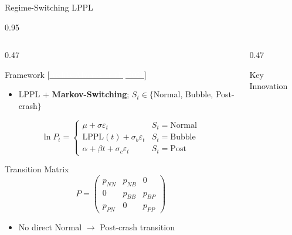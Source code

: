 \documentclass[9pt, aspectratio=169, t]{beamer}
\begin{document}
\begin{frame}{Regime-Switching LPPL}
    \begin{cminipage}{0.95\textwidth}
    {\scriptsize
    \begin{columns}[T]
        \begin{column}{0.47\textwidth}
            \begin{block}{Framework {\scriptsize[\href{https://doi.org/10.1016/j.physa.2020.125367}{\textcolor{white}{Ardila-Alvarez et al., 2021}}]}}
                \begin{itemize}\setlength{\itemsep}{0pt}
                    \item LPPL + \textbf{Markov-Switching}; $S_t \in \{$Normal, Bubble, Post-crash$\}$
                \end{itemize}
                \vspace{-2mm}
                $$\ln P_t = \begin{cases}
                    \mu + \sigma\varepsilon_t & S_t = \text{Normal} \\
                    \text{LPPL}(t) + \sigma_b\varepsilon_t & S_t = \text{Bubble} \\
                    \alpha + \beta t + \sigma_c\varepsilon_t & S_t = \text{Post}
                \end{cases}$$
            \end{block}
            \vspace{-2mm}
            \begin{exampleblock}{Transition Matrix}
                \vspace{-2mm}
                $$P = \begin{pmatrix}
                    p_{NN} & p_{NB} & 0 \\
                    0 & p_{BB} & p_{BP} \\
                    p_{PN} & 0 & p_{PP}
                \end{pmatrix}$$
                \vspace{-4mm}
                \begin{itemize}\setlength{\itemsep}{0pt}
                    \item No direct Normal $\to$ Post-crash transition
                \end{itemize}
            \end{exampleblock}
        \end{column}
        \begin{column}{0.47\textwidth}
            \begin{exampleblock}{Key Innovation}

\end{exampleblock}
\end{column}
\end{columns}}
\end{cminipage}
\end{frame}
\end{document}
